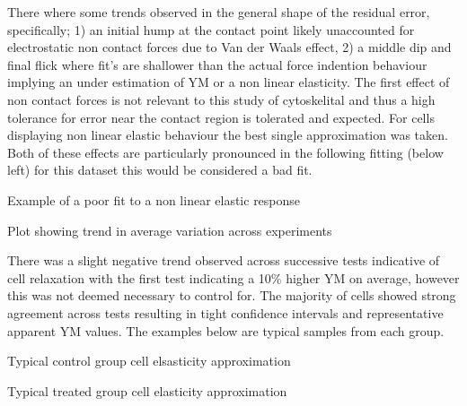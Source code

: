 \documentclass[
  paper=a4,
  ,captions=tableheading
]{scrartcl}
\makeatletter
\newcommand*\pandocbounded[1]{%
  \sbox\pandoc@box{#1}%
  \Gscale@div\@tempa{\textheight}{\dimexpr\ht\pandoc@box+\dp\pandoc@box\relax}%
  \Gscale@div\@tempb{\linewidth}{\wd\pandoc@box}%
  \ifdim\@tempb\p@<\@tempa\p@\let\@tempa\@tempb\fi%
  \ifdim\@tempa\p@<\p@\scalebox{\@tempa}{\usebox\pandoc@box}%
  \else\usebox{\pandoc@box}%
  \fi%
}
\renewenvironment{quote}{\begin{customblockquote}\list{}{\rightmargin=0em\leftmargin=0em}%
\item\relax\color{blockquote-text}\ignorespaces}{\unskip\unskip\endlist\end{customblockquote}}
\makeatother
\begin{document}
There where some trends observed in the general shape of the residual
error, specifically; 1) an initial hump at the contact point likely
unaccounted for electrostatic non contact forces due to Van der Waals
effect, 2) a middle dip and final flick where fit's are shallower than
the actual force indention behaviour implying an under estimation of YM
or a non linear elasticity. The first effect of non contact forces is
not relevant to this study of cytoskelital and thus a high tolerance for
error near the contact region is tolerated and expected. For cells
displaying non linear elastic behaviour the best single approximation
was taken. Both of these effects are particularly pronounced in the
following fitting (below left) for this dataset this would be considered
a bad fit.

\noindent
\begin{minipage}[t]{0.48\textwidth}
\begin{quote}
\pandocbounded{}
Example of a poor fit to a non linear elastic response
\end{quote}
\end{minipage}
\hfill
\begin{minipage}[t]{0.48\textwidth}
\begin{quote}
\pandocbounded{}
Plot showing trend in average variation across experiments
\end{quote}
\end{minipage}

There was a slight negative trend observed across successive tests
indicative of cell relaxation with the first test indicating a 10\%
higher YM on average, however this was not deemed necessary to control
for. The majority of cells showed strong agreement across tests
resulting in tight confidence intervals and representative apparent YM
values. The examples below are typical samples from each group.

\noindent
\begin{minipage}[t]{0.48\textwidth}
\begin{quote}
\pandocbounded{}
Typical control group cell elsasticity approximation
\end{quote}
\end{minipage}
\hfill
\begin{minipage}[t]{0.48\textwidth}
\begin{quote}
\pandocbounded{}
Typical treated group cell elasticity approximation
\end{quote}
\end{minipage}
\end{document}
